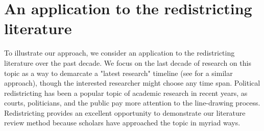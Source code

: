 \documentclass{cup-pan}
\begin{document}
\begin{comment}
        \item What might be implications or downstream effects of our study findings? (follow arrows downstream from DV node)
        \item What are important confounding variables we should consider? (isolate network related to IV and DV and use as starter causal DAG)
    \end{itemize}
    \item \emph{Easy} -- Workload/expertise level allows low barrier to entry: researchers only need focus on substantiating reasonable rules/parameters and input of single-pieces of research in this process (of which training within usual graduate programs generally cover) since these are the building blocks to the approach; while developed expertise and substantive knowledge always help, more junior researchers can still take this approach based on common skills.
    \item Second-order reasons why network approach can work given the above:
    \begin{itemize}
        \item We're in a Goldilocks situation for most literature review coverage as these are often in the ranges of 100 or so reference pieces which constitutes a medium sized network. Some patterns are too hard to discern by eye/hand (network bigger than a handful of nodes) yet exact statistics and patterns of interest can be calculated (no approximations needed as we might for large networks).
    \end{itemize}
    \item The above can be easily implemented in our open source \texttt{R} package \texttt{NetLit}.
\end{enumerate}

\end{comment}

\section*{An application to the redistricting literature}
To illustrate our approach, we consider an application to the redistricting literature over the past decade. We focus on the last decade of research on this topic as a way to demarcate a "latest research" timeline (see \citet{dion_gendered_2018} for a similar approach), though the interested researcher might choose any time span.
Political redistricting has been a popular topic of academic research in recent years, as courts, politicians, and the public pay more attention to the line-drawing process. Redistricting provides an excellent opportunity to demonstrate our literature review method because scholars have approached the topic in myriad ways. 
\end{document}
